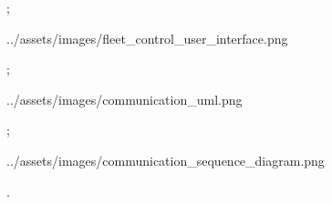 \pg;


\centerline{\picw=16cm \inspic ../assets/images/fleet_control_user_interface.png }

\pg;


\centerline{\picw=16cm \inspic ../assets/images/communication_uml.png }

\pg;


\centerline{\picw=16cm \inspic ../assets/images/communication_sequence_diagram.png }

\pg.

